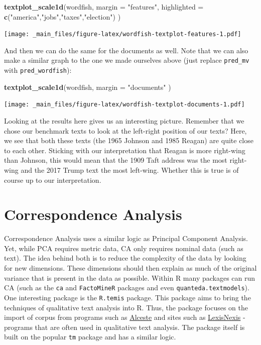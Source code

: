 \documentclass[
]{book}
\newenvironment{Shaded}{\begin{snugshade}}{\end{snugshade}}
\newcommand{\AttributeTok}[1]{\textcolor[rgb]{0.13,0.29,0.53}{#1}}
\newcommand{\FunctionTok}[1]{\textcolor[rgb]{0.13,0.29,0.53}{\textbf{#1}}}
\newcommand{\NormalTok}[1]{#1}
\newcommand{\StringTok}[1]{\textcolor[rgb]{0.31,0.60,0.02}{#1}}
\begin{document}
\begin{Shaded}
\begin{Highlighting}[]
\FunctionTok{textplot\_scale1d}\NormalTok{(wordfish,}
                 \AttributeTok{margin =} \StringTok{"features"}\NormalTok{,}
                 \AttributeTok{highlighted =} \FunctionTok{c}\NormalTok{(}\StringTok{"america"}\NormalTok{,}\StringTok{"jobs"}\NormalTok{,}\StringTok{"taxes"}\NormalTok{,}\StringTok{"election"}\NormalTok{)}
\NormalTok{                 )}
\end{Highlighting}
\end{Shaded}

\texttt{[image: \_main\_files/figure-latex/wordfish-textplot-features-1.pdf]}

And then we can do the same for the documents as well. Note that we can also make a similar graph to the one we made ourselves above (just replace \texttt{pred\_mv} with \texttt{pred\_wordfish}):

\begin{Shaded}
\begin{Highlighting}[]
\FunctionTok{textplot\_scale1d}\NormalTok{(wordfish,}
                 \AttributeTok{margin =} \StringTok{"documents"}
\NormalTok{                 )}
\end{Highlighting}
\end{Shaded}

\texttt{[image: \_main\_files/figure-latex/wordfish-textplot-documents-1.pdf]}

Looking at the results here gives us an interesting picture. Remember that we chose our benchmark texts to look at the left-right position of our texts? Here, we see that both these texts (the 1965 Johnson and 1985 Reagan) are quite close to each other. Sticking with our interpretation that Reagan is more right-wing than Johnson, this would mean that the 1909 Taft address was the most right-wing and the 2017 Trump text the most left-wing. Whether this is true is of course up to our interpretation.

\section{Correspondence Analysis}\label{correspondence-analysis}

Correspondence Analysis uses a similar logic as Principal Component Analysis. Yet, while PCA requires metric data, CA only requires nominal data (such as text). The idea behind both is to reduce the complexity of the data by looking for new dimensions. These dimensions should then explain as much of the original variance that is present in the data as possible. Within R many packages can run CA (such as the \texttt{ca} and \texttt{FactoMineR} packages and even \texttt{quanteda.textmodels}). One interesting package is the \texttt{R.temis} package. This package aims to bring the techniques of qualitative text analysis into R. Thus, the package focuses on the import of corpus from programs such as \href{https://www.image-zafar.com/Logicieluk.html}{Alceste} and sites such as \href{https://www.lexisnexis.com}{LexisNexis} - programs that are often used in qualitative text analysis. The package itself is built on the popular \texttt{tm} package and has a similar logic.
\end{document}

